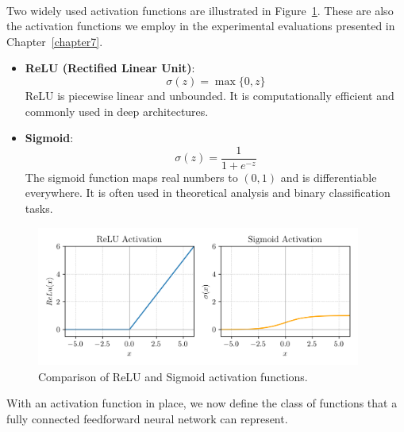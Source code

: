 \begin{example} \ \\
Two widely used activation functions are illustrated in
Figure~\ref{fig:activation_functions}. These are also the activation functions
we employ in the experimental evaluations presented in Chapter~\ref{chapter7}.

\begin{itemize}
    \item \textbf{ReLU (Rectified Linear Unit)}:
    \begin{equation*}
        \sigma(z) = \max\{0, z\}
    \end{equation*}
    ReLU is piecewise linear and unbounded. It is computationally efficient and commonly used in deep architectures.
    
    \item \textbf{Sigmoid}:
    \begin{equation*}
        \sigma(z) = \frac{1}{1 + e^{-z}}
    \end{equation*}
    The sigmoid function maps real numbers to $(0,1)$ and is differentiable everywhere. It is often used in theoretical analysis and binary classification tasks.
\end{itemize}
\end{example}

\begin{figure}[H]
  \centering
  \includegraphics[width=0.95\textwidth]{Figures/activations_functions.png}
  \caption{Comparison of ReLU and Sigmoid activation functions.}
  \label{fig:activation_functions}
\end{figure}

With an activation function in place, we now define the class of functions that a fully connected feedforward neural network can represent.

